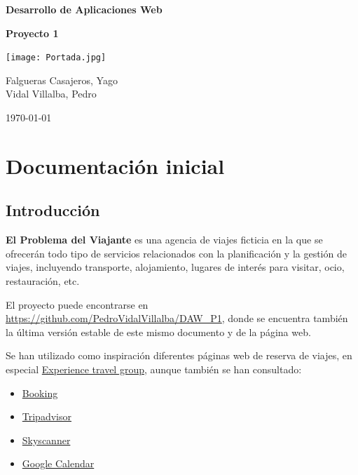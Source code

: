 \documentclass[11pt, a4paper]{book}
\begin{document}
	
	\begin{titlepage}
		\centering
		
		{\Huge \bfseries Desarrollo de Aplicaciones Web\par}
		\vspace{1cm}
		{\Huge \bfseries Proyecto 1\par}
		\vspace{2.5cm}
		
		\texttt{[image: Portada.jpg]}\par
		\vspace{2.5cm}
		
		
		
		{\Large
			Falgueras Casajeros, Yago \\
			Vidal Villalba, Pedro \\
			\par}
		\vspace{1.5cm}
		
		{\Large \today\par}
	\end{titlepage}
	
	\tableofcontents
	\newpage
	\thispagestyle{empty}
	
	\chapter{Documentación inicial}
	
	\section{Introducción}
	\textbf{El Problema del Viajante} es una agencia de viajes ficticia en la que se ofrecerán todo tipo de servicios relacionados con la planificación y la gestión de viajes, incluyendo transporte, alojamiento, lugares de interés para visitar, ocio, restauración, etc.
	
	El proyecto puede encontrarse en \href{https://github.com/PedroVidalVillalba/DAW_P1}{https://github.com/PedroVidalVillalba/DAW\_P1}, donde se encuentra también la última versión estable de este mismo documento y de la página web.
	
	
	Se han utilizado como inspiración diferentes páginas web de reserva de viajes, en especial \href{https://experiencetravelgroup.com}{Experience travel group}, aunque también se han consultado:
	\begin{itemize}
		\item \href{https://booking.com}{Booking}
		\item \href{https://tripadvisor.es}{Tripadvisor}
		\item \href{https://skyscanner.es}{Skyscanner}
		\item \href{https://calendar.google.com/calendar/u/0/r}{Google Calendar}
	\end{itemize}
	
\end{document}
